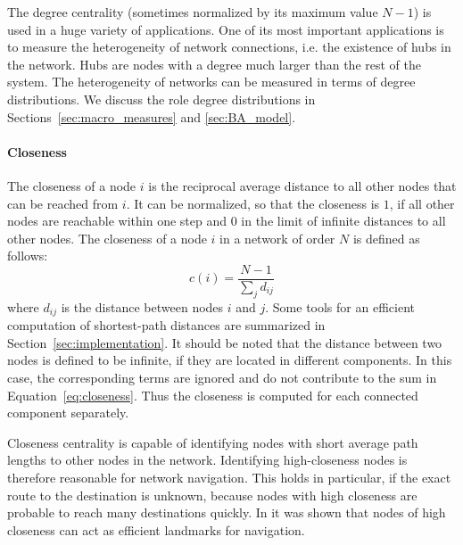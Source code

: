 The degree centrality (sometimes normalized by its maximum value $N-1$) is used in a huge variety of applications.
One of its most important applications is to measure the heterogeneity of network connections, i.e. the existence of hubs in the network.
Hubs are nodes with a degree much larger than the rest of the system.
The heterogeneity of networks can be measured in terms of degree distributions.
We discuss the role degree distributions in Sections~\ref{sec:macro_measures} and \ref{sec:BA_model}.

\paragraph{Closeness\color{Cayenne}{.}} 
The closeness of a node $i$ is the reciprocal average distance to all other nodes that can be reached from $i$.
It can be normalized, so that the closeness is $1$, if all other nodes are reachable within one step and $0$ in the limit of infinite distances to all other nodes.
The closeness of a node $i$ in a network of order $N$ is defined as follows:
\begin{equation}\label{eq:closeness}
c(i)=\frac{N-1}{ \sum _j  d_{ij}}
\end{equation}
where $d_{ij}$ is the distance between nodes $i$ and $j$.
Some tools for an efficient computation of shortest-path distances are summarized in Section~\ref{sec:implementation}.
It should be noted that the distance between two nodes is defined to be infinite, if they are located in different components.
In this case, the corresponding terms are ignored and do not contribute to the sum in Equation~\eqref{eq:closeness}.
Thus the closeness is computed for each connected component separately.

Closeness centrality is capable of identifying nodes with short average path lengths to other nodes in the network.
Identifying high-closeness nodes is therefore reasonable for network navigation.
This holds in particular, if the exact route to the destination is unknown, because nodes with high closeness are probable to reach many destinations quickly.
In \citep{Zweig:closeness} it was shown that nodes of high closeness can act as efficient landmarks for navigation.

